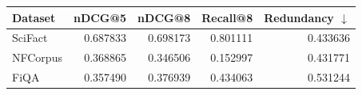 \begin{tabular}{lrrrr}
\toprule
Dataset & nDCG@5 & nDCG@8 & Recall@8 & Redundancy $\downarrow$\\
\midrule
SciFact & 0.687833 & 0.698173 & 0.801111 & 0.433636\\
NFCorpus & 0.368865 & 0.346506 & 0.152997 & 0.431771\\
FiQA & 0.357490 & 0.376939 & 0.434063 & 0.531244\\
\bottomrule
\end{tabular}
